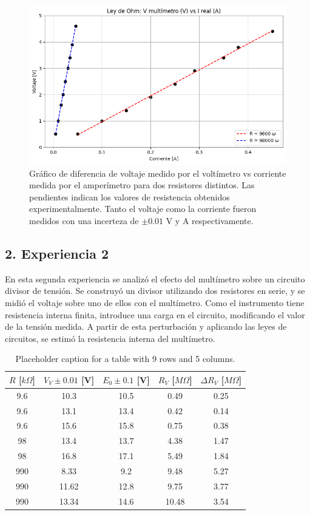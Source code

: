 \documentclass[11pt]{article}
\begin{document}
\begin{figure}[H]
    \centering
    \includegraphics[width=0.8\linewidth]{Ohm.png}
    \caption{Gráfico de diferencia de voltaje medido por el voltímetro vs corriente medida por el amperímetro para dos resistores distintos. Las pendientes indican los valores de resistencia obtenidos experimentalmente. Tanto el voltaje como la corriente fueron medidos con una incerteza de $\pm 0.01$ V y A respectivamente.}
    \label{fig:ohm}
\end{figure}

\subsection*{2. Experiencia 2}

En esta segunda experiencia se analizó el efecto del multímetro sobre un circuito divisor de tensión. Se construyó un divisor utilizando dos resistores en serie, y se midió el voltaje sobre uno de ellos con el multímetro. Como el instrumento tiene resistencia interna finita, introduce una carga en el circuito, modificando el valor de la tensión medida. A partir de esta perturbación y aplicando las leyes de circuitos, se estimó la resistencia interna del multímetro.

\begin{table}[h]
    \centering
    \begin{tabular}{|c|c|c|c|c|}
        \hline
        $R$ [$k\Omega$]  & $V_V \pm 0.01$ [V] & $E_0 \pm 0.1$ [V] & $R_V$ [$M\Omega$] & $\Delta R_V$ [$M\Omega$] \\ \hline
        9.6   & 10.3   & 10.5   & 0.49   & 0.25 \\ \hline
        9.6   & 13.1   & 13.4   & 0.42   & 0.14 \\ \hline
        9.6   & 15.6   & 15.8   & 0.75   & 0.38 \\ \hline
        98    & 13.4   & 13.7   & 4.38   & 1.47 \\ \hline
        98    & 16.8   & 17.1   & 5.49   & 1.84 \\ \hline
        990   & 8.33   & 9.2    & 9.48   & 5.27 \\ \hline
        990   & 11.62  & 12.8   & 9.75   & 3.77 \\ \hline
        990   & 13.34  & 14.6   & 10.48  & 3.54 \\ \hline
    \end{tabular}
    \caption{Placeholder caption for a table with 9 rows and 5 columns.}
    \label{tab:placeholder_label}
\end{table}
\end{document}
